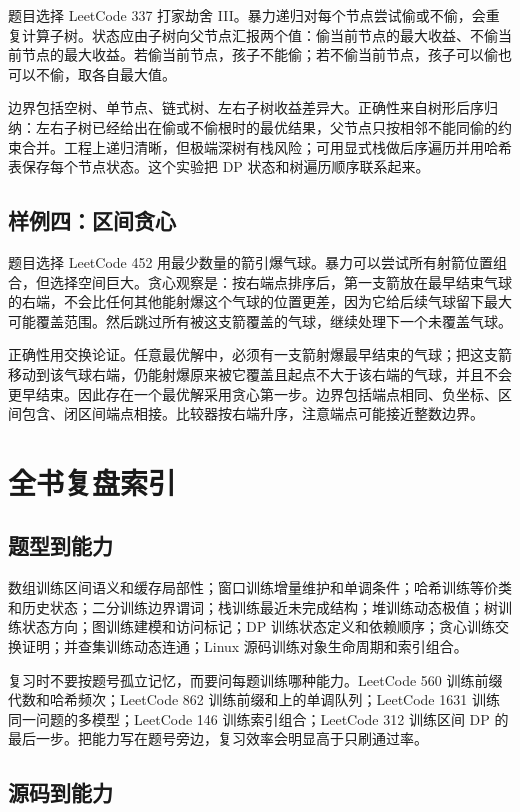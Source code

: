题目选择 LeetCode 337 打家劫舍 III。暴力递归对每个节点尝试偷或不偷，会重复计算子树。状态应由子树向父节点汇报两个值：偷当前节点的最大收益、不偷当前节点的最大收益。若偷当前节点，孩子不能偷；若不偷当前节点，孩子可以偷也可以不偷，取各自最大值。

边界包括空树、单节点、链式树、左右子树收益差异大。正确性来自树形后序归纳：左右子树已经给出在偷或不偷根时的最优结果，父节点只按相邻不能同偷的约束合并。工程上递归清晰，但极端深树有栈风险；可用显式栈做后序遍历并用哈希表保存每个节点状态。这个实验把 DP 状态和树遍历顺序联系起来。

\subsection{样例四：区间贪心}

题目选择 LeetCode 452 用最少数量的箭引爆气球。暴力可以尝试所有射箭位置组合，但选择空间巨大。贪心观察是：按右端点排序后，第一支箭放在最早结束气球的右端，不会比任何其他能射爆这个气球的位置更差，因为它给后续气球留下最大可能覆盖范围。然后跳过所有被这支箭覆盖的气球，继续处理下一个未覆盖气球。

正确性用交换论证。任意最优解中，必须有一支箭射爆最早结束的气球；把这支箭移动到该气球右端，仍能射爆原来被它覆盖且起点不大于该右端的气球，并且不会更早结束。因此存在一个最优解采用贪心第一步。边界包括端点相同、负坐标、区间包含、闭区间端点相接。比较器按右端升序，注意端点可能接近整数边界。

\section{全书复盘索引}

\subsection{题型到能力}

数组训练区间语义和缓存局部性；窗口训练增量维护和单调条件；哈希训练等价类和历史状态；二分训练边界谓词；栈训练最近未完成结构；堆训练动态极值；树训练状态方向；图训练建模和访问标记；DP 训练状态定义和依赖顺序；贪心训练交换证明；并查集训练动态连通；Linux 源码训练对象生命周期和索引组合。

复习时不要按题号孤立记忆，而要问每题训练哪种能力。LeetCode 560 训练前缀代数和哈希频次；LeetCode 862 训练前缀和上的单调队列；LeetCode 1631 训练同一问题的多模型；LeetCode 146 训练索引组合；LeetCode 312 训练区间 DP 的最后一步。把能力写在题号旁边，复习效率会明显高于只刷通过率。

\subsection{源码到能力}

